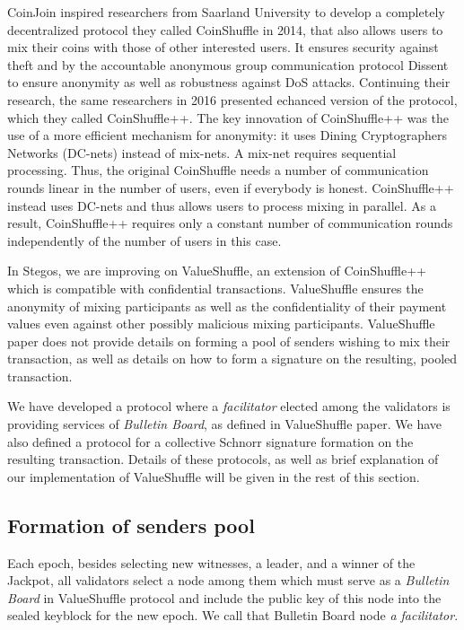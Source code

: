 \documentclass[a4paper, 10pt, conference]{ieeeconf}
\begin{document}
CoinJoin inspired researchers from Saarland University to develop a completely decentralized protocol they called CoinShuffle\cite{c17} in 2014, that also allows users to mix their coins with those of other interested users. It ensures security against theft and by the accountable anonymous group communication protocol Dissent to ensure anonymity as
well as robustness against DoS attacks. Continuing their research, the same researchers in 2016 presented echanced version of the protocol, which they called CoinShuffle++\cite{c18}. The key innovation of CoinShuffle++ was the use of a more efficient mechanism for anonymity: it uses Dining Cryptographers Networks (DC-nets)\cite{c20} instead of mix-nets. A mix-net requires sequential processing. Thus, the original CoinShuffle needs a number of communication rounds linear in the number of users, even if everybody is honest. CoinShuffle++ instead uses DC-nets and thus allows users to process mixing in parallel. As a result, CoinShuffle++ requires only a constant number of communication rounds independently of the number of users in this case. 

In Stegos, we are improving on ValueShuffle\cite{c19}, an extension of CoinShuffle++ which is compatible with confidential transactions. ValueShuffle ensures the
anonymity of mixing participants as well as the confidentiality of their
payment values even against other possibly malicious mixing participants. ValueShuffle paper does not provide details on forming a pool of senders wishing to mix their transaction, as well as details on how to form a signature on the resulting, pooled transaction. 

We have developed a protocol where a \textit{facilitator} elected among the validators is providing services of \textit{Bulletin Board}, as defined in ValueShuffle paper. We have also defined a protocol for a collective Schnorr signature\cite{c22} formation on the resulting transaction. Details of these protocols, as well as brief explanation of our implementation of ValueShuffle will be given in the rest of this section.

\subsection{Formation of senders pool}
Each epoch, besides selecting new witnesses, a leader, and a winner of the Jackpot, all validators select a node among them which must serve as a \textit{Bulletin Board} in ValueShuffle protocol and include the public key of this node into the sealed keyblock for the new epoch. We call that Bulletin Board node \textit{a facilitator}.
\end{document}
